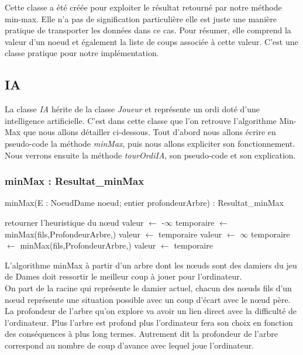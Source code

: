 \documentclass[12,french]{report}
\begin{document}
Cette classe a été créée pour exploiter le résultat retourné par notre méthode min-max. Elle n'a pas de signification particulière elle est juste une manière pratique de transporter les données dans ce cas. Pour résumer, elle comprend la valeur d'un noeud et également la liste de coups associée à cette valeur. C'est une classe pratique pour notre implémentation.

\subsection{IA}

La classe \textit{IA} hérite de la classe \textit{Joueur} et représente un ordi doté d'une intelligence artificielle. C'est dans cette classe que l'on retrouve l'algorithme Min-Max que nous allons détailler ci-dessous. Tout d'abord nous allons écrire en pseudo-code la méthode \textit{minMax}, puis nous allons expliciter son fonctionnement. Nous verrons ensuite la méthode \textit{tourOrdiIA}, son pseudo-code et son explication.

\subsubsection{minMax : Resultat\_minMax}

\begin{algorithm}
	\caption{minMax(E : NoeudDame noeud; entier profondeurArbre) : Resultat\_minMax}
	\begin{algorithmic}
		\State retourner l'heuristique du nœud
	\EndIf
		\State valeur $\leftarrow$ -$\infty$
			\State temporaire $\leftarrow$ minMax(fils,ProfondeurArbre,)
				\State valeur $\leftarrow$ temporaire
			\EndIf
		\EndFor
	\Else
		\State valeur $\leftarrow$ $\infty$
		\State temporaire $\leftarrow$ minMax(fils,ProfondeurArbre,)
			\State valeur $\leftarrow$ temporaire
		\EndIf
	\EndIf
	\end{algorithmic}
\end{algorithm}\vspace{0.4cm}


L'algorithme minMax à partir d'un arbre dont les nœuds sont des damiers du jeu de Dames doit ressortir le meilleur coup à jouer pour l'ordinateur.\\

On part de la racine qui représente le damier actuel, chacun des nœuds fils d'un nœud représente une situation possible avec un coup d'écart avec le nœud père. La profondeur de l'arbre qu'on explore va avoir un lien direct avec la difficulté de l'ordinateur. Plus l'arbre est profond plus l'ordinateur fera son choix en fonction des conséquences à plus long termes. Autrement dit la profondeur de l'arbre correspond au nombre de coup d'avance avec lequel joue l'ordinateur. \\
\end{document}

